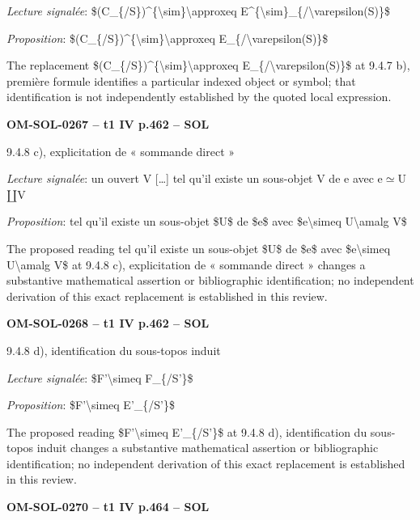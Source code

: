 \emph{Lecture signalée}: \$(C\_\{/S\})\textasciicircum{}\{\textbackslash{}sim\}\textbackslash{}approxeq E\textasciicircum{}\{\textbackslash{}sim\}\_\{/\textbackslash{}varepsilon(S)\}\$\par
\emph{Proposition}: \$(C\_\{/S\})\textasciicircum{}\{\textbackslash{}sim\}\textbackslash{}approxeq E\_\{/\textbackslash{}varepsilon(S)\}\$\par
The replacement \$(C\_\{/S\})\textasciicircum{}\{\textbackslash{}sim\}\textbackslash{}approxeq E\_\{/\textbackslash{}varepsilon(S)\}\$ at 9.4.7 b), première formule identifies a particular indexed object or symbol; that identification is not independently established by the quoted local expression.\par
\par\noindent\textbf{OM-SOL-0267 -- t1 IV p.462 -- SOL}\par
9.4.8 c), explicitation de « sommande direct »\par
\emph{Lecture signalée}: un ouvert V […] tel qu'il existe un sous-objet V de e avec e\ensuremath{\simeq}U\ensuremath{\amalg}V\par
\emph{Proposition}: tel qu'il existe un sous-objet \$U\$ de \$e\$ avec \$e\textbackslash{}simeq U\textbackslash{}amalg V\$\par
The proposed reading tel qu'il existe un sous-objet \$U\$ de \$e\$ avec \$e\textbackslash{}simeq U\textbackslash{}amalg V\$ at 9.4.8 c), explicitation de « sommande direct » changes a substantive mathematical assertion or bibliographic identification; no independent derivation of this exact replacement is established in this review.\par
\par\noindent\textbf{OM-SOL-0268 -- t1 IV p.462 -- SOL}\par
9.4.8 d), identification du sous-topos induit\par
\emph{Lecture signalée}: \$F'\textbackslash{}simeq F\_\{/S'\}\$\par
\emph{Proposition}: \$F'\textbackslash{}simeq E'\_\{/S'\}\$\par
The proposed reading \$F'\textbackslash{}simeq E'\_\{/S'\}\$ at 9.4.8 d), identification du sous-topos induit changes a substantive mathematical assertion or bibliographic identification; no independent derivation of this exact replacement is established in this review.\par
\par\noindent\textbf{OM-SOL-0270 -- t1 IV p.464 -- SOL}\par
